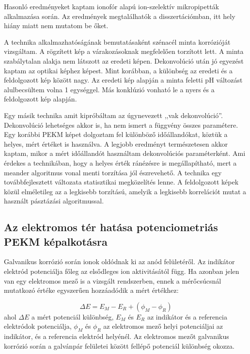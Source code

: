 Hasonló eredményeket kaptam ionofór alapú ion-szelektív mikropipetták alkalmazása során.
Az eredmények megtalálhatók a disszertációmban, itt hely hiány miatt nem mutatom be őket.

A technika alkalmazhatóságának bemutatásaként szénacél minta korrózióját vizsgáltam.
A rögzített kép a várakozásoknak megfelelően torzított lett.
A minta szabálytalan alakja nem látszott az eredeti képen.
Dekonvolúció után jó egyezést kaptam az optikai képhez képest.
Mint korábban, a különbség az eredeti és a feldolgozott kép között nagy.
Az eredeti kép alapján a minta feletti pH változást alulbecsültem volna 1 egységgel.
Más konklúzió vonható le a nyers és a feldolgozott kép alapján.

Egy másik technika amit kipróbáltam az úgynevezett ,,vak dekonvolúció''.
Dekonvolúció lehetséges akkor is, ha nem ismert a függvény összes paramétere.
Egy korábbi PEKM képet dolgoztam fel különböző időállandókat, köztük a helyes, mért értéket is  használva. 
A legjobb eredményt természetesen akkor kaptam, mikor a mért időállandót használtam dekonvolúciós paraméterként.
Ami érdekes a technikában, hogy a helyes érték ránézésre is megállapítható, mert a meander algoritmus vonal menti torzítása jól észrevehető.
A technika egy továbbfejlesztett változata statisztikai megközelítés lenne.
A feldolgozott képek közül elméletileg az a legkisebb torzítású, amelyik a legkisebb korrelációt mutat a használt pásztázási algoritmussal.

\subsection{Az elektromos tér hatása potenciometriás PEKM képalkotásra}
Galvanikus korrózió során ionok oldódnak ki az anód felületéről.
Az indikátor elektród potenciálja főleg az elsődleges ion aktivitásától függ.
Ha azonban jelen van egy elektromos mező is a vizsgált rendszerben, ennek a mérőcsúcsnál mutatkozó értéke egyszerűen hozzáadódik a mért értékhez:

\begin{equation}
\Delta E=E_M-E_R + (\phi_M - \phi_R)
\label{eq:potential}
\end{equation}
ahol $\Delta E$ a mért potenciál különbség, $E_M$ és $E_R$ az indikátor és a referencia elektródok potenciálja, $\phi_M$ és $\phi_R$ az elektromos mező helyi potenciáljai az indikátor, és a referencia elektród helyénél.
Az elektromos mezőt galvanikus korrózió során a galvánpár felületei között fellépő potenciál különbség okozza.


